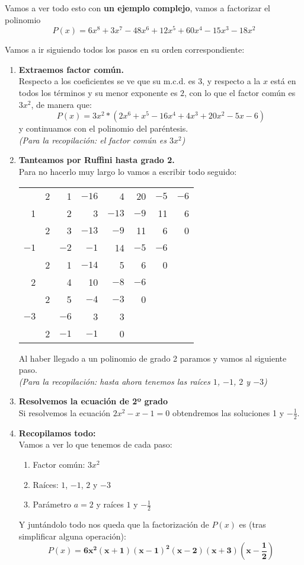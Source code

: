 \documentclass[a4paper,11pt,answers]{exam}
\begin{document}
Vamos a ver todo esto con \textbf{un ejemplo complejo}, vamos a factorizar el polinomio
\[P(x) = 6x^8+3x^7-48x^6+12x^5+60x^4-15x^3-18x^2\]
\begin{solution}
  Vamos a ir siguiendo todos los pasos en su orden correspondiente:
  \begin{enumerate}
  \item \textbf{Extraemos factor común.}\\
    Respecto a los coeficientes se ve que su m.c.d. es $3$, y respecto a la
    $x$ está en todos los términos y su menor exponente es $2$, con lo que el
    factor común es $3x^2$, de manera que:
    \[P(x) = 3x^2*(2x^6+x^5-16x^4+4x^3+20x^2-5x - 6)\]
    y continuamos con el polinomio del paréntesis.\\
    \emph{(Para la recopilación: el factor común es $3x^2$)}
  \item \textbf{Tanteamos por Ruffini hasta grado 2.}\\
    Para no hacerlo muy largo lo vamos a escribir todo seguido:
    \begin{center}
      \begin{tabular}{r|rrrrrrr}
        &2&1&$-16$&4&20&$-5$&$-6$\\
        1&&2&3&$-13$&$-9$&11&6\\
        \hline
        &2&3&$-13$&$-9$&11&6&0\\
        $-1$&&$-2$&$-1$&14&$-5$&$-6$&\\
        \cline{1-7}
        &2&1&$-14$&5&6&0&\\
        2&&4&10&$-8$&$-6$&&\\
        \cline{1-6}
        &2&5&$-4$&$-3$&0&&\\
        $-3$&&$-6$&3&3&&&\\
        \cline{1-5}
        &2&$-1$&$-1$&0&&&
      \end{tabular}
    \end{center}
    Al haber llegado a un polinomio de grado 2 paramos y vamos al siguiente
    paso.\\
    \emph{(Para la recopilación: hasta ahora tenemos las raíces $1$, $-1$,
      $2$ y $-3$)}
  \item \textbf{Resolvemos la ecuación de 2º grado}\\
    Si resolvemos la ecuación $2x^2 - x -1 = 0$ obtendremos las soluciones 1 y $-\frac{1}{2}$.
  \item \textbf{Recopilamos todo:}\\
    Vamos a ver lo que tenemos de cada paso:
    \begin{enumerate}
    \item Factor común: $3x^2$
    \item Raíces: $1$, $-1$, $2$ y $-3$
    \item Parámetro $a=2$ y raíces $1$ y $-\frac{1}{2}$
    \end{enumerate}
    Y juntándolo todo nos queda que la factorización de $P(x)$ es (tras simplificar alguna operación):
    \[P(x) = \boldsymbol{6x^2(x+1)(x-1)^2(x-2)(x+3)\left(x-\frac{1}{2}\right)}\]
  \end{enumerate}
\end{solution}
\end{document}

